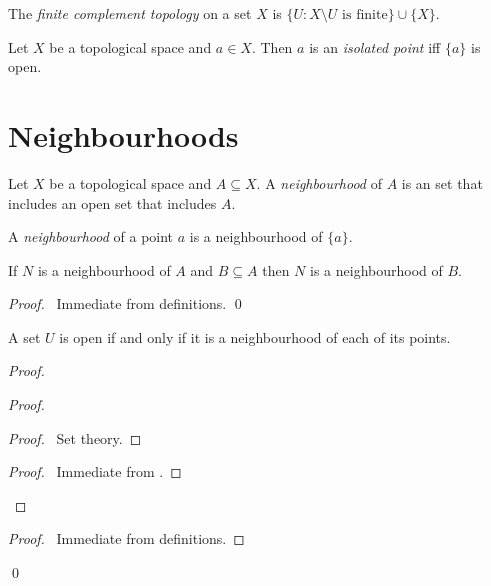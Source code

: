 \begin{df}
  The \emph{finite complement topology} on a set $X$ is $\{ U : X \setminus U
  \text{ is finite} \} \cup \{ X \}$.
\end{df}

\begin{df}
  Let $X$ be a topological space and $a \in X$. Then $a$ is an \emph{isolated
    point} iff $\{a\}$ is open.
\end{df}

\section{Neighbourhoods}

\begin{df}[Neighbourhood]
  Let $X$ be a topological space and $A \subseteq X$. A \emph{neighbourhood}
  of $A$ is an set that includes an open set that includes $A$.

  A \emph{neighbourhood} of a point $a$ is a neighbourhood of $\{a\}$.
\end{df}

\begin{prop}
  If $N$ is a neighbourhood of $A$ and $B \subseteq A$ then $N$ is a
  neighbourhood of $B$.
\end{prop}

\begin{proof}
  \pf\ Immediate from definitions. \qed
\end{proof}

\begin{prop}
  \label{prop:topology:neighbourhood:open}
  A set $U$ is open if and only if it is a neighbourhood of each of its
  points.
\end{prop}

\begin{proof}
  \pf
  \begin{proof}
    \begin{proof}
      \pf\ Set theory.
    \end{proof}
    \begin{proof}
      \pf\ Immediate from .
    \end{proof}
  \end{proof}
  \begin{proof}
    \pf\ Immediate from definitions.
  \end{proof}
  \qed
\end{proof}


